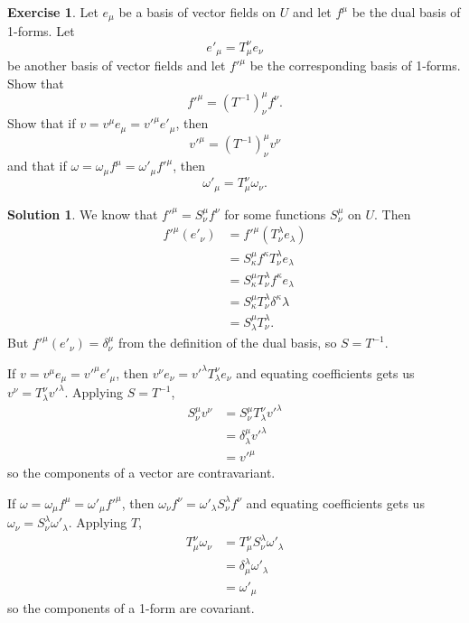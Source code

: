\documentclass[11pt, a4paper]{report}
\theoremstyle{definition}
\newtheorem{exercise}{Exercise}[part]
\newtheorem{solution}{Solution}[part]
\newenvironment{ex}{\begin{exercise}}{\end{exercise}\pagebreak[1]}
\newenvironment{sol}{\begin{solution}}{\end{solution}\pagebreak[3]}
\begin{document}
\begin{ex}

Let $e_\mu$ be a basis of vector fields on $U$ and let $f^\mu$ be the dual basis of 1-forms. Let
\[
    e'_\mu = T_\mu^\nu e_\nu
\]
be another basis of vector fields and let $f'^\mu$ be the corresponding basis of 1-forms. Show that
\[
    f'^\mu = {(T^{-1})}^\mu_\nu f^\nu.
\]
Show that if $v = v^\mu e_\mu = v'^\mu e'_\mu$, then
\[
    v'^\mu = {(T^{-1})}^\mu_\nu v^\nu
\]
and that if $\omega = \omega_\mu f^\mu = \omega'_\mu f'^\mu$, then
\[
    \omega'_\mu = T_\mu^\nu \omega_\nu.
\]

\end{ex}

\begin{sol}

We know that $f'^\mu = S_\nu^\mu f^\nu$ for some functions $S_\nu^\mu$ on $U$.
Then
\begin{align*}
    f'^\mu(e'_\nu) &= f'^\mu(T^\lambda_\nu e_\lambda) \\
                   &= S^\mu_\kappa f^\kappa T^\lambda_\nu e_\lambda \\
                   &= S^\mu_\kappa T^\lambda_\nu f^\kappa e_\lambda \\
                   &= S^\mu_\kappa T^\lambda_\nu \delta^\kappa\lambda \\
                   &= S^\mu_\lambda T^\lambda_\nu.
\end{align*}
But $f'^\mu(e'_\nu) = \delta^\mu_\nu$ from the definition of the dual basis, so $S = T^{-1}$.

If $v = v^\mu e_\mu = v'^\mu e'_\mu$, then $v^\nu e_\nu = v'^\lambda T_\lambda^\nu e_\nu$ and equating coefficients gets us $v^\nu = T_\lambda^\nu v'^\lambda$.
Applying $S = T^{-1}$,
\begin{align*}
    S^\mu_\nu v^\nu &= S^\mu_\nu T_\lambda^\nu v'^\lambda \\
                    &= \delta^\mu_\lambda v'^\lambda \\
                    &= v'^\mu
\end{align*}
so the components of a vector are contravariant.

If $\omega = \omega_\mu f^\mu = \omega'_\mu f'^\mu$, then $\omega_\nu f^\nu = \omega'_\lambda S^\lambda_\nu f^\nu$ and equating coefficients gets us $\omega_\nu = S_\nu^\lambda \omega'_\lambda$.
Applying $T$,
\begin{align*}
    T_\mu^\nu \omega_\nu &= T_\mu^\nu S_\nu^\lambda \omega'_\lambda \\
                         &= \delta^\lambda_\mu \omega'_\lambda \\
                         &= \omega'_\mu
\end{align*}
so the components of a 1-form are covariant.

\end{sol}
\end{document}
